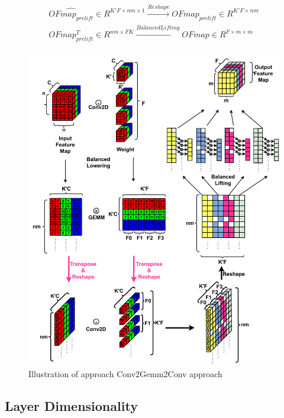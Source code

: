 \begin{equation}
    \begin{aligned}
        \hat{OFmap_{prelift}} \in R^{K'F \times nm \times 1} \xrightarrow[]{Reshape} OFmap_{prelift} \in R^{K'F\times nm} \\
        OFmap_{prelift}^T \in R^{nm\times FK} \xrightarrow[]{Balanced Lifting} OFmap \in R^{F \times m \times m} \\
            \end{aligned}
    \label{math:conv2gemm2conv:lift}
\end{equation}

\begin{figure}[]
    \centering
    \includegraphics[scale=0.5]{fig/ConvToGemmToConv.pdf}
    \caption{Illustration of approach Conv2Gemm2Conv approach}
    \label{fig:conv2gemm2conv}
\end{figure}

\subsection{Layer Dimensionality}
\label{chap:dda:dataflow_dse:indirect_mode:layer_dimentionality}

